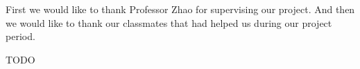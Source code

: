 \documentclass[../main.tex]{subfiles}
\begin{document}
First we would like to thank Professor Zhao for supervising our project.  And then we would like to thank our classmates that had helped us during our project period.

TODO
\end{document}
